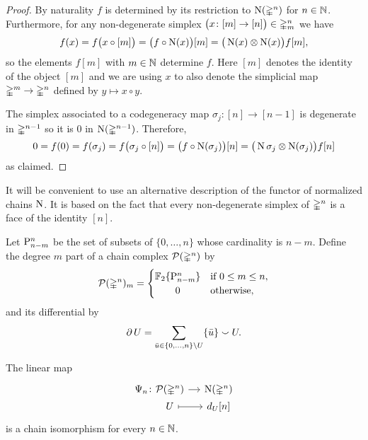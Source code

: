 \begin{proof}
	By naturality $f$ is determined by its restriction to $\chains(\simplex^n)$ for $n \in \N$.
	Furthermore, for any non-degenerate simplex $\big( x \colon [m] \to [n] \big) \in \simplex^n_m$ we have
	\[
	f(x) = f \big( x \circ [m] \big) =
	\big( f \circ \chains(x) \big) [m] =
	\big( \chains(x) \ot \chains(x) \big) f[m],
	\]
	so the elements $f[m]$ with $m \in \N$ determine $f$.
	Here $[m]$ denotes the identity of the object $[m]$ and we are using $x$ to also denote the simplicial map $\simplex^m \to \simplex^n$ defined by $y \mapsto x \circ y$.

	The simplex associated to a codegeneracy map $\sigma_j \colon [n] \to [n-1]$ is degenerate in $\simplex^{n-1}$ so it is $0$ in $\chains(\simplex^{n-1})$.
	Therefore,
	\[
	0 = f(0) = f(\sigma_j) =
	f \big( \sigma_j \circ [n] \big) =
	\big( f \circ \chains(\sigma_j) \big) [n] =
	\big( \chains \sigma_j \ot \chains(\sigma_j) \big) f[n]
	\]
	as claimed.
\end{proof}

It will be convenient to use an alternative description of the functor of normalized chains $\chains$.
It is based on the fact that every non-degenerate simplex of $\simplex^n$ is a face of the identity $[n]$.

\begin{definition} \label{d:dual standard chains}
	Let $\P_{n-m}^n$ be the set of subsets of $\{0, \dots, n\}$ whose cardinality is $n-m$.
	Define the degree $m$ part of a chain complex $\cP(\simplex^n)$ by
	\[
	\cP(\simplex^n)_m = \begin{cases}
	\F\{\P_{n-m}^n\} & \text{if } 0 \leq m \leq n, \\
	\hfil 0 & \text{otherwise},
	\end{cases}
	\]
	and its differential by
	\[
	\bd U = \sum_{\bar u \in \{0, \dots, n\} \setminus U} \{\bar u\} \union U.
	\]
\end{definition}

\begin{lemma}
	The linear map
	\[
	\begin{tikzcd} [column sep=small, row sep=0]
	\Psi_n \colon &[-20pt] \cP(\simplex^n) \arrow[r] & \chains(\simplex^n) \\
	& U \arrow[r, mapsto] & d_U [n]
	\end{tikzcd}
	\]
	is a chain isomorphism for every $n \in \N$.
\end{lemma}


